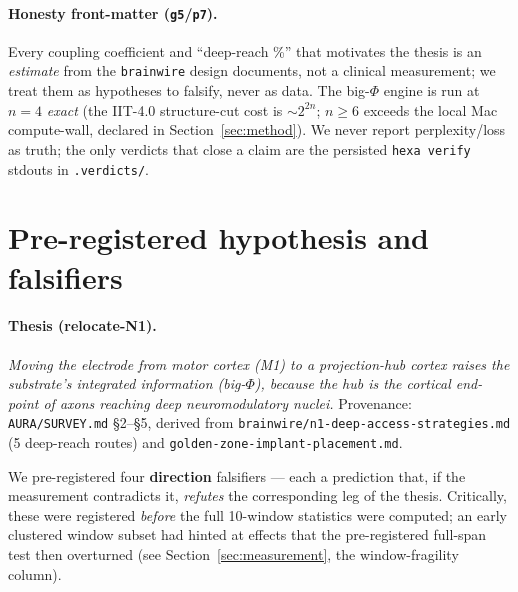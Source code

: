 \documentclass[11pt,a4paper]{article}
\begin{document}
\paragraph{Honesty front-matter (\texttt{g5}/\texttt{p7}).}
Every coupling coefficient and ``deep-reach \%'' that motivates the thesis is
an \emph{estimate} from the \texttt{brainwire} design documents, not a clinical
measurement; we treat them as hypotheses to falsify, never as data. The
big-$\Phi$ engine is run at $n{=}4$ \emph{exact} (the IIT-4.0 structure-cut
cost is $\sim2^{2n}$; $n{\ge}6$ exceeds the local Mac compute-wall, declared in
Section~\ref{sec:method}). We never report perplexity/loss as truth; the only
verdicts that close a claim are the persisted \texttt{hexa verify} stdouts in
\texttt{.verdicts/}.

\section{Pre-registered hypothesis and falsifiers}\label{sec:hypothesis}

\paragraph{Thesis (relocate-N1).}
\emph{Moving the electrode from motor cortex (M1) to a projection-hub cortex
raises the substrate's integrated information (big-$\Phi$), because the hub is
the cortical end-point of axons reaching deep neuromodulatory nuclei.}
Provenance: \texttt{AURA/SURVEY.md} \S2--\S5, derived from
\texttt{brainwire/n1-deep-access-strategies.md} (5 deep-reach routes) and
\texttt{golden-zone-implant-placement.md}.

We pre-registered four \textbf{direction} falsifiers --- each a prediction that,
if the measurement contradicts it, \emph{refutes} the corresponding leg of the
thesis. Critically, these were registered \emph{before} the full 10-window
statistics were computed; an early clustered window subset had hinted at
effects that the pre-registered full-span test then overturned (see
Section~\ref{sec:measurement}, the window-fragility column).
\end{document}
